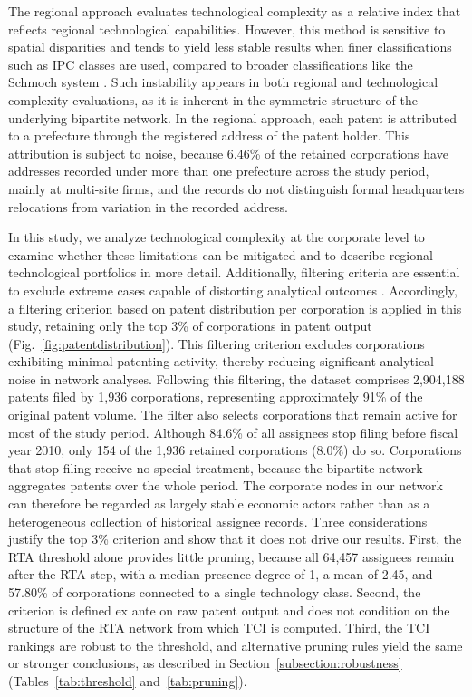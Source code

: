 \documentclass[lineno,pdflatex,sn-mathphys-num]{sn-jnl}%
\theoremstyle{thmstyleone}%
\theoremstyle{thmstyletwo}%
\theoremstyle{thmstylethree}%
\begin{document}
The regional approach evaluates technological complexity as a relative index that reflects regional technological capabilities.
However, this method is sensitive to spatial disparities and tends to yield less stable results when finer classifications such as IPC classes are used, compared to broader classifications like the Schmoch system \cite{PintarEssletzbichler2022}.
Such instability appears in both regional and technological complexity evaluations, as it is inherent in the symmetric structure of the underlying bipartite network.
In the regional approach, each patent is attributed to a prefecture through the registered address of the patent holder.
This attribution is subject to noise, because 6.46\% of the retained corporations have addresses recorded under more than one prefecture across the study period, mainly at multi-site firms, and the records do not distinguish formal headquarters relocations from variation in the recorded address.

In this study, we analyze technological complexity at the corporate level to examine whether these limitations can be mitigated and to describe regional technological portfolios in more detail.
Additionally, filtering criteria are essential to exclude extreme cases capable of distorting analytical outcomes \cite{Hidalgo2021,PintarScherngell2022}. Accordingly, a filtering criterion based on patent distribution per corporation is applied in this study, retaining only the top 3\% of corporations in patent output (Fig.~\ref{fig:patentdistribution}). This filtering criterion excludes corporations exhibiting minimal patenting activity, thereby reducing significant analytical noise in network analyses. Following this filtering, the dataset comprises 2,904,188 patents filed by 1,936 corporations, representing approximately 91\% of the original patent volume.
The filter also selects corporations that remain active for most of the study period.
Although 84.6\% of all assignees stop filing before fiscal year 2010, only 154 of the 1,936 retained corporations (8.0\%) do so.
Corporations that stop filing receive no special treatment, because the bipartite network aggregates patents over the whole period.
The corporate nodes in our network can therefore be regarded as largely stable economic actors rather than as a heterogeneous collection of historical assignee records.
Three considerations justify the top 3\% criterion and show that it does not drive our results.
First, the RTA threshold alone provides little pruning, because all 64,457 assignees remain after the RTA step, with a median presence degree of 1, a mean of 2.45, and 57.80\% of corporations connected to a single technology class.
Second, the criterion is defined ex ante on raw patent output and does not condition on the structure of the RTA network from which TCI is computed.
Third, the TCI rankings are robust to the threshold, and alternative pruning rules yield the same or stronger conclusions, as described in Section~\ref{subsection:robustness} (Tables~\ref{tab:threshold} and~\ref{tab:pruning}).
\end{document}
